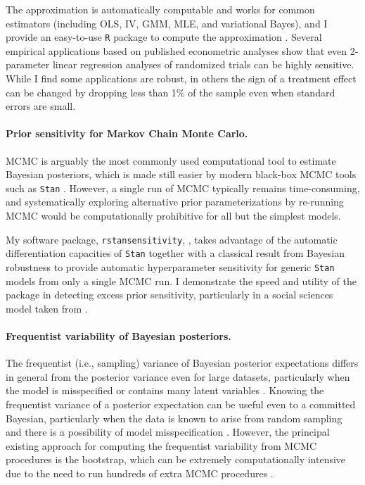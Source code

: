 The approximation is automatically computable and works for common estimators
(including OLS, IV, GMM, MLE, and variational Bayes), and I provide an
easy-to-use \texttt{R} package to compute the approximation
\citep{zaminfluence}. Several empirical applications based on published
econometric analyses \citep{angelucci:2009:indirect, finkelstein:2012:oregon,
meager:2019:microcredit} show that even 2-parameter linear regression analyses
of randomized trials can be highly sensitive. While I find some applications are
robust, in others the sign of a treatment effect can be changed by dropping less
than 1\% of the sample even when standard errors are small.



\paragraph{Prior sensitivity for Markov Chain Monte Carlo.}

MCMC is arguably the most commonly used computational tool to estimate Bayesian
posteriors, which is made still easier by modern black-box MCMC tools such as
\texttt{Stan} \citep{carpenter:2017:stan, rstan}.  However, a single run of MCMC
typically remains time-consuming, and systematically exploring alternative prior
parameterizations by re-running MCMC would be computationally prohibitive for
all but the simplest models.

My software package, \texttt{rstansensitivity},
\citep{giordano:2020:rstansensitivity, giordano:2018:mcmchyper}, takes advantage
of the automatic differentiation capacities of \texttt{Stan}
\citep{carpenter:2015:stanmath} together with a classical result from  Bayesian
robustness \citep{gustafson:1996:localposterior, basu:1996:local,
giordano:2018:covariances} to provide automatic hyperparameter sensitivity for
generic \texttt{Stan} models from only a single MCMC run.  I demonstrate the
speed and utility of the package in detecting excess prior sensitivity,
particularly in a social sciences model taken from \citet[Chapter
13.5]{gelman:2006:arm}.


\paragraph{Frequentist variability of Bayesian posteriors.}

The frequentist (i.e., sampling) variance of Bayesian posterior expectations
differs in general from the posterior variance even for large datasets,
particularly when the model is misspecified or contains many latent variables
\citep{kleijn:2006:misspecification}.
Knowing the frequentist variance of a posterior expectation can be useful even
to a committed Bayesian, particularly when the data is known to arise from
random sampling and there is a possibility of model misspecification
\citep{waddell:2002:bayesphyloboot}.  However, the
principal existing approach for computing the frequentist variability from MCMC
procedures is the bootstrap, which can be extremely computationally intensive
due to the need to run hundreds of extra MCMC procedures
\citep{huggins:2019:bayesbag}.

